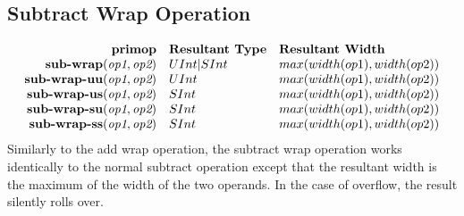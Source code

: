 \documentclass[12pt]{article}
\begin{document}
\subsection{Subtract Wrap Operation}
\[
\begin{array}{rll}
\text{\bf primop} & \text{\bf Resultant Type} & \text{\bf Resultant Width} \\
\text{\bf sub-wrap}(   \text{\em op1}, \text{\em op2}) & UInt|SInt & max(width(op1),width(op2)) \\
\text{\bf sub-wrap-uu}(\text{\em op1}, \text{\em op2}) & UInt & max(width(op1),width(op2)) \\
\text{\bf sub-wrap-us}(\text{\em op1}, \text{\em op2}) & SInt & max(width(op1),width(op2)) \\
\text{\bf sub-wrap-su}(\text{\em op1}, \text{\em op2}) & SInt & max(width(op1),width(op2)) \\
\text{\bf sub-wrap-ss}(\text{\em op1}, \text{\em op2}) & SInt & max(width(op1),width(op2)) \\
\end{array}
\]
Similarly to the add wrap operation, the subtract wrap operation works identically to the normal subtract operation except that the resultant width is the maximum of the width of the two operands.
In the case of overflow, the result silently rolls over.
\end{document}
